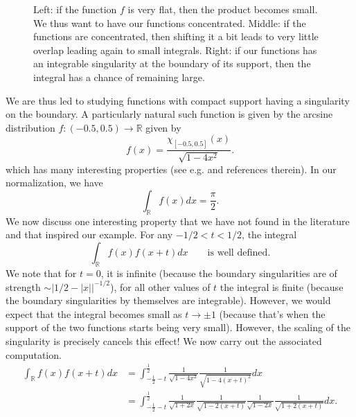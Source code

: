 \documentclass{amsart}
\theoremstyle{remark}
\begin{document}
{\begin{figure}[h!]
\caption{Left: if the function $f$ is very flat, then the product becomes small. We thus want to have our functions concentrated. Middle: if the functions
are concentrated, then shifting it a bit leads to very little overlap leading again to small integrals. Right: if our functions has an integrable singularity at the boundary of its support, then
the integral has a chance of remaining large.}
\end{figure}
We are thus led to studying functions with compact support having a singularity on the boundary. A particularly natural such function is given by the
arcsine distribution $f:(-0.5, 0.5) \rightarrow \mathbb{R}$ given by
$$ f(x) = \frac{\chi_{[-0.5,0.5]}(x)}{\sqrt{1-4x^2}}.$$
which has many interesting properties (see e.g. \cite{coif} and references therein). In our normalization, we have
$$ \int_{\mathbb{R}}{f(x) dx} = \frac{\pi}{2}.$$
We now discuss one interesting property that we have not found in the literature and that inspired our example. For any $-1/2 < t < 1/2$, the integral
$$  \int_{\mathbb{R}}{f(x)f(x+t)dx} \qquad \mbox{is well defined}.$$
We note that for $t=0$, it is infinite (because the boundary singularities are of strength $\sim |1/2 - |x||^{-1/2}$), for all other values of $t$ the integral is finite (because
the boundary singularities by themselves are integrable). However, we would expect that the integral becomes small as $t \rightarrow  \pm 1$ (because that's when the
support of the two functions starts being very small). However, the scaling of the singularity is precisely cancels this effect!
We now carry out the associated computation.
\begin{align*}
 \int_{\mathbb{R}}{ f(x) f(x+t) dx} &= \int_{-\frac{1}{2} - t}^{\frac12}{ \frac{1}{\sqrt{1-4x^2}} \frac{1}{\sqrt{1-4(x+t)^2}}dx} \\
 &=\int_{-\frac{1}{2} - t}^{\frac12}{  \frac{1}{\sqrt{1+2x}} \frac{1}{\sqrt{1-2(x+t)}}  \frac{1}{\sqrt{1-2x}} \frac{1}{\sqrt{1+2(x+t)}} dx}.

\end{align*}}
\end{document}
